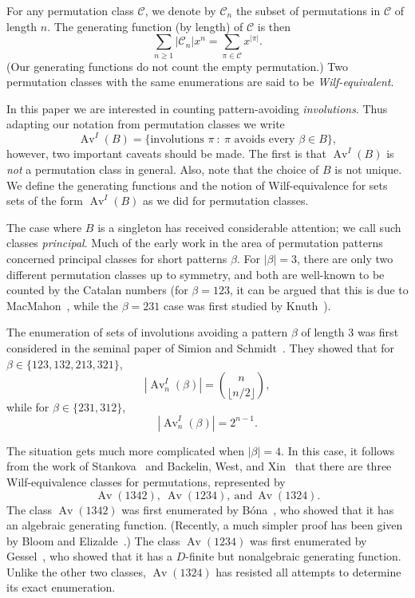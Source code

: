\documentclass[10pt]{article}
\theoremstyle{plain}
\newcommand{\Av}{\operatorname{Av}}
\newcommand{\C}{\mathcal{C}}
\newcommand{\st}{\::\:}
\begin{document}
For any permutation class $\C$, we denote by $\C_n$ the subset of permutations in $\C$ of length $n$. The generating function (by length) of $\C$ is then
\[
\sum_{n\ge 1} |\C_n|x^n=\sum_{\pi\in\C} x^{|\pi|}.
\]
(Our generating functions do not count the empty permutation.) Two permutation classes with the same enumerations are said to be \emph{Wilf-equivalent}.

In this paper we are interested in counting pattern-avoiding \emph{involutions}. Thus adapting our notation from permutation classes we write
\[
\Av^I(B)=\{\text{involutions }\pi\st \text{$\pi$ avoids every $\beta\in B$}\},
\]
however, two important caveats should be made. The first is that $\Av^I(B)$ is \emph{not} a permutation class in general. Also, note that the choice of $B$ is not unique. We define the generating functions and the notion of Wilf-equivalence for sets sets of the form $\Av^I(B)$ as we did for permutation classes.

%
%
%
%
%
%
%
%
%
%
%
%

The case where $B$ is a singleton has received considerable attention; we call such classes \emph{principal}. Much of the early work in the area of permutation patterns concerned principal classes for short patterns $\beta$. For $|\beta|=3$, there are only two different permutation classes up to symmetry, and both are well-known to be counted by the Catalan numbers (for $\beta=123$, it can be argued that this is due to MacMahon~\cite[Volume I, Section III, Chapter V]{macmahon:combinatory-ana:}, while the $\beta=231$ case was first studied by Knuth~\cite[Section 2.2.1, Exercises 4 and 5]{knuth:the-art-of-comp:1}).

The enumeration of sets of involutions avoiding a pattern $\beta$ of length $3$ was first considered in the seminal paper of Simion and Schmidt~\cite{simion:restricted-perm:}. They showed that for $\beta\in\{123,132,213,321\}$,
	\[
	|\Av^I_n(\beta)|={n\choose \lfloor n/2\rfloor},
	\]
while for $\beta\in\{231,312\}$,
	\[
	|\Av^I_n(\beta)|=2^{n-1}.
	\]

The situation gets much more complicated when $|\beta|=4$. In this case, it follows from the work of Stankova~\cite{stankova:forbidden-subse:} and Backelin, West, and Xin~\cite{backelin:wilf-equivalenc:} that there are three Wilf-equivalence classes for permutations, represented by
\[
\Av(1342),\ \Av(1234),\ \text{and}\ \Av(1324).
\]
The class $\Av(1342)$ was first enumerated by B\'ona~\cite{bona:exact-enumerati:}, who showed that it has an algebraic generating function. (Recently, a much simpler proof has been given by Bloom and Elizalde~\cite{bloom:pattern-avoidan:}.) The class $\Av(1234)$ was first enumerated by Gessel~\cite{gessel:symmetric-funct:}, who showed that it has a $D$-finite but nonalgebraic generating function. Unlike the other two classes, $\Av(1324)$ has resisted all attempts to determine its exact enumeration.
\end{document}
